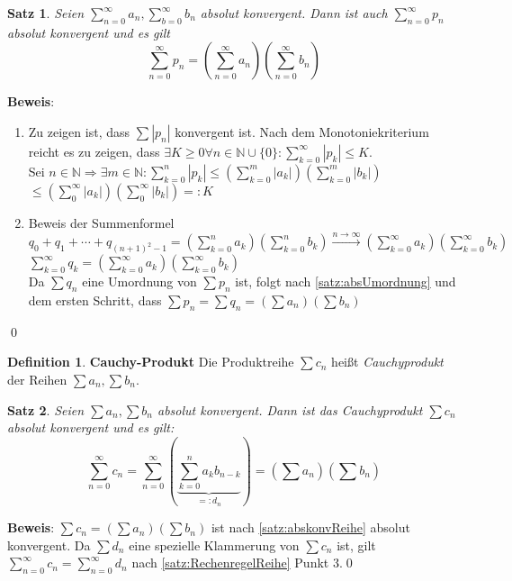 \documentclass[ngerman,titlepage,twoside, parskip=half*]{scrreprt}
\newcommand*{\N}{\mathbb{N}}
\theoremstyle{plain}
\newtheorem{theorem}{Satz}[section]
\theoremstyle{definition}
\newtheorem{definition}{Definition}
\theoremstyle{remark}
\begin{document}
\begin{theorem}
\label{satz:abskonvReihe}
Seien $\sum_{n=0}^\infty a_n, \sum_{b=0}^\infty b_n$ absolut konvergent. Dann ist auch $\sum_{n=0}^\infty p_n$ absolut
konvergent und es gilt
\[\sum_{n=0}^\infty p_n=\left(\sum_{n=0}^\infty a_n\right)\left(\sum_{n=0}^\infty b_n\right)\]
\end{theorem}
\textbf{Beweis}:
\begin{enumerate}[1. Schr{i}tt]
  \item Zu zeigen ist, dass $\sum |p_n|$ konvergent ist. Nach dem Monotoniekriterium reicht es zu zeigen, dass
    $\exists K \geq 0 \forall n \in \N \cup \{0\}\colon\sum_{k=0}^\infty |p_k|\leq K$.\\
    Sei $n \in \N \Rightarrow \exists m \in \N \colon \sum_{k=0}^n |p_k|\leq (\sum_{k=0}^m |a_k|)(\sum_{k=0}^m |b_k|)$\\
    $\leq
    (\sum_0^\infty |a_k|)(\sum_0^\infty |b_k|)=:K$
  \item Beweis der Summenformel
    $q_0+q_1+\cdots +q_{(n+1)^2-1}=(\sum_{k=0}^n a_k)(\sum_{k=0}^n b_k)\stackrel{n\rightarrow \infty}{\rightarrow}
    (\sum_{k=0}^\infty a_k)(\sum_{k=0}^\infty b_k)$\\
    $\sum_{k=0}^\infty q_k=(\sum_{k=0}^\infty a_k)(\sum_{k=0}^\infty b_k)$\\
    Da $\sum q_n$ eine Umordnung von $\sum p_n$ ist, folgt nach \autoref{satz:absUmordnung} und dem ersten Schritt, dass
    $\sum p_n=\sum q_n = (\sum a_n)(\sum b_n)$
\end{enumerate}
\qed

\begin{definition}
\textbf{Cauchy-Produkt} %
Die Produktreihe $\sum c_n$ heißt \emph{Cauchyprodukt} der Reihen $\sum a_n, \sum b_n$.
\end{definition}

\begin{theorem}
Seien $\sum a_n, \sum b_n$ absolut konvergent. Dann ist das Cauchyprodukt $\sum c_n$ absolut konvergent und es gilt:
\[\sum_{n=0}^\infty c_n = \sum_{n=0}^\infty \left(\underbrace{\sum_{k=0}^n a_k b_{n-k}}_{=:d_n}\right) = \left(\sum a_n\right)\left(\sum b_n\right)\]
\end{theorem}
\textbf{Beweis}: $\sum c_n=(\sum a_n)(\sum b_n)$ ist nach \autoref{satz:abskonvReihe} absolut konvergent. Da $\sum d_n$ eine
spezielle Klammerung von $\sum c_n$ ist, gilt $\sum_{n=0}^\infty c_n=\sum_{n=0}^\infty d_n$ nach
\autoref{satz:RechenregelReihe} Punkt 3.\qed
\end{document}
